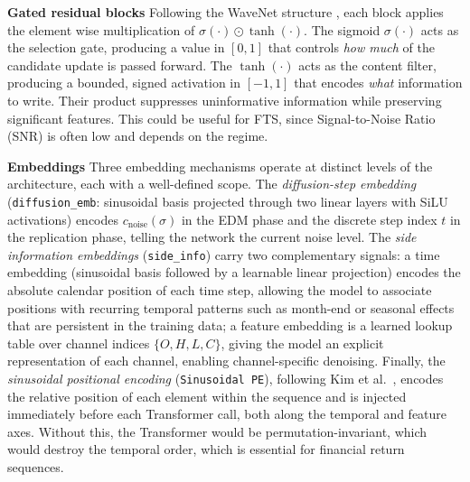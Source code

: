 \textbf{Gated residual blocks} \quad Following the WaveNet structure 
\cite{oord2016wavenet}, each block applies the element wise multiplication of \(\sigma(\cdot) \odot 
\tanh(\cdot)\). The 
sigmoid \(\sigma(\cdot)\) acts as the selection gate, producing a value 
in \([0,1]\) that controls \emph{how much} of the candidate update is passed 
forward. The \(\tanh(\cdot)\) acts as the content filter, producing a 
bounded, signed activation in \([-1,1]\) that encodes \emph{what} 
information to write. Their product suppresses uninformative information 
while preserving significant features. This could be useful for FTS, since Signal-to-Noise Ratio (SNR) is often low and depends on the regime. 

\textbf{Embeddings} \quad Three embedding mechanisms operate at distinct 
levels of the architecture, each with a well-defined scope. The 
\emph{diffusion-step embedding} (\texttt{diffusion\_emb}: sinusoidal basis projected through two 
linear layers with SiLU activations) encodes \(c_{\text{noise}}(\sigma)\) 
in the EDM phase and the discrete step index \(t\) in the replication 
phase, telling the network the current noise level. The \emph{side information embeddings} (\texttt{side\_info})
carry two complementary signals: a time embedding (sinusoidal basis 
followed by a learnable linear projection) encodes the absolute calendar 
position of each time step, allowing the model to associate positions 
with recurring temporal patterns such as month-end or seasonal effects 
that are persistent in the training data; a feature 
embedding is a learned lookup table over channel indices \(\{O, H, L, 
C\}\), giving the model an explicit representation of each channel, enabling channel-specific denoising. Finally, the 
\emph{sinusoidal positional encoding} (\texttt{Sinusoidal PE}), following Kim et al.\ \cite{kim2025diffusion}, 
encodes the relative position of each element within the sequence and is 
injected immediately before each Transformer call, both along the 
temporal and feature axes. Without this, the Transformer would be permutation-invariant, which would destroy the temporal order, which is essential for financial return sequences.

